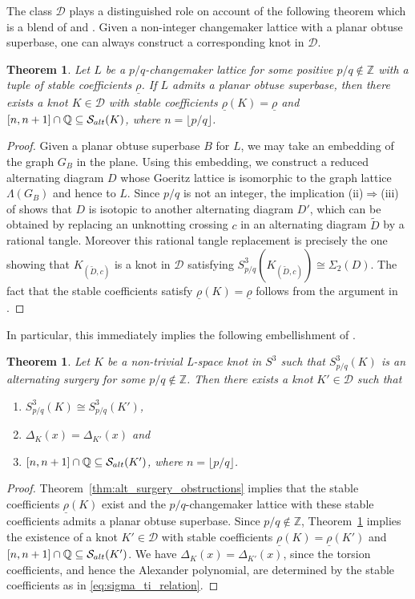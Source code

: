 \documentclass{amsart} %
\newcommand{\D}{\mathcal{D}}
\newcommand{\Z}{\mathbb{Z}}
\newcommand{\Q}{\mathbb{Q}}
\newcommand{\Salt}{\mathcal{S}_{\rm alt}}
\theoremstyle{thm}
\newtheorem{thm}[Theorem]{Theorem}
\theoremstyle{definition}
\numberwithin{equation}{section}
\begin{document}
The class $\D$ plays a distinguished role on account of the following theorem which is a blend of \cite[Theorem~1.3]{Mc15} and \cite[Theorem~7.12]{Mc16}. Given a non-integer changemaker lattice with a planar obtuse superbase, one can always construct a corresponding knot in $\D$.
\begin{thm}\label{thm:stable_coefs_to_D}
    Let $L$ be a $p/q$-changemaker lattice for some positive $p/q\notin \Z$ with a tuple of stable coefficients $\underline{\rho}$. If $L$ admits a planar obtuse superbase, then there exists a knot $K\in \D$ with stable coefficients $\underline{\rho}(K)=\underline{\rho}$ and $[n,n+1]\cap \Q\subseteq \Salt(K)$, where $n=\lfloor p/q \rfloor$.
\end{thm}
\begin{proof}
Given a planar obtuse superbase $B$ for $L$, we may take an embedding of the graph $G_B$ in the plane. Using this embedding, we construct a reduced alternating diagram $D$ whose Goeritz lattice is isomorphic to the graph lattice $\Lambda(G_B)$ and hence to $L$. Since $p/q$ is not an integer, the implication (ii)$\Rightarrow$(iii) of \cite[Theorem~1.3]{Mc15} shows that $D$ is isotopic to another alternating diagram $D'$, which can be obtained by replacing an unknotting crossing $c$ in an alternating diagram $\widetilde{D}$ by a rational tangle. Moreover this rational tangle replacement is precisely the one showing that $K_{(\widetilde{D},c)}$ is a knot in $\D$ satisfying $S_{p/q}^3(K_{(\widetilde{D},c)})\cong \Sigma_2(D)$. The fact that the stable coefficients satisfy $\underline{\rho}(K)=\underline{\rho}$ follows from the argument in \cite[Proof of Theorem 7.12]{Mc16}.
\end{proof}
In particular, this immediately implies the following embellishment of \cite[Theorem~7.12]{Mc16}.
\begin{thm}\label{thm:nonint_alt_surg}
Let $K$ be a non-trivial %
L-space knot in $S^3$ such that $S_{p/q}^3(K)$ is an alternating surgery for some $p/q\not\in \Z$. Then there exists a knot $K'\in \D$ such that
\begin{enumerate}
    \item $S_{p/q}^3(K)\cong S_{p/q}^3(K')$,
    \item $\Delta_{K}(x)=\Delta_{K'}(x)$ and
    \item $[n, n+1] \cap \Q \subseteq \Salt(K')$, where $n=\lfloor p/q \rfloor$.
\end{enumerate}
\end{thm}
\begin{proof}
    Theorem~\ref{thm:alt_surgery_obstructions} implies that the stable coefficients $\underline{\rho}(K)$ exist and the $p/q$-changemaker lattice with these stable coefficients admits a planar obtuse superbase. Since $p/q\not\in \Z$, Theorem~\ref{thm:stable_coefs_to_D} implies the existence of a knot $K'\in \D$ with stable coefficients $\underline{\rho}(K)=\underline{\rho}(K')$ and $[n,n+1] \cap \Q \subseteq \Salt(K')$. We have $\Delta_{K}(x)=\Delta_{K'}(x)$, since the torsion coefficients, and hence the Alexander polynomial, are determined by the stable coefficients as in \eqref{eq:sigma_ti_relation}. 
\end{proof}
\end{document}
